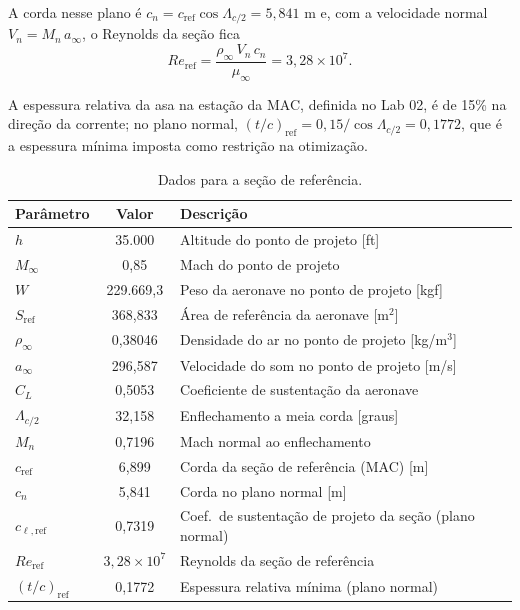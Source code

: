 A corda nesse plano é $c_n = c_{\mathrm{ref}}\cos\Lambda_{c/2} = 5{,}841$ m e,
com a velocidade normal $V_n = M_n\,a_\infty$, o Reynolds da seção fica
\begin{equation*}
    Re_{\mathrm{ref}} = \frac{\rho_\infty\,V_n\,c_n}{\mu_\infty}
        = 3{,}28 \times 10^{7}.
\end{equation*}

A espessura relativa da asa na estação da MAC, definida no Lab 02, é de 15\%
na direção da corrente; no plano normal,
$(t/c)_{\mathrm{ref}} = 0{,}15/\cos\Lambda_{c/2} = 0{,}1772$, que é a
espessura mínima imposta como restrição na otimização.

\begin{table}[H]
\centering
\caption{Dados para a seção de referência.}\label{tab:ref_section}
\renewcommand{\arraystretch}{1.25}
\begin{tabular}{lcl}
\toprule
Parâmetro & Valor & Descrição \\
\midrule
$h$                     & 35.000 & Altitude do ponto de projeto [ft] \\
$M_\infty$              & 0,85 & Mach do ponto de projeto \\
$W$                     & 229.669,3 & Peso da aeronave no ponto de projeto [kgf] \\
$S_{\mathrm{ref}}$      & 368,833 & Área de referência da aeronave [m$^2$] \\
$\rho_\infty$           & 0,38046 & Densidade do ar no ponto de projeto [kg/m$^3$] \\
$a_\infty$              & 296,587 & Velocidade do som no ponto de projeto [m/s] \\
$C_L$                   & 0,5053 & Coeficiente de sustentação da aeronave \\
$\Lambda_{c/2}$         & 32,158 & Enflechamento a meia corda [graus] \\
$M_n$                   & 0,7196 & Mach normal ao enflechamento \\
$c_{\mathrm{ref}}$      & 6,899 & Corda da seção de referência (MAC) [m] \\
$c_n$                   & 5,841 & Corda no plano normal [m] \\
$c_{\ell,\mathrm{ref}}$ & 0,7319 & Coef.\ de sustentação de projeto da seção (plano normal) \\
$Re_{\mathrm{ref}}$     & $3{,}28\times 10^{7}$ & Reynolds da seção de referência \\
$(t/c)_{\mathrm{ref}}$  & 0,1772 & Espessura relativa mínima (plano normal) \\
\bottomrule
\end{tabular}
\end{table}
